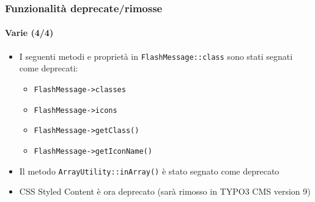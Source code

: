 \begin{frame}[fragile]
	\frametitle{Funzionalità deprecate/rimosse}
	\framesubtitle{Varie (4/4)}

	\begin{itemize}

		\item I seguenti metodi e proprietà in \texttt{FlashMessage::class}
			sono stati segnati come deprecati:

			\begin{itemize}
				\item \texttt{FlashMessage->classes}
				\item \texttt{FlashMessage->icons}
				\item \texttt{FlashMessage->getClass()}
				\item \texttt{FlashMessage->getIconName()}
			\end{itemize}

		\item Il metodo \texttt{ArrayUtility::inArray()} è stato segnato come deprecato

		\item CSS Styled Content è ora deprecato\newline
			\small(sarà rimosso in TYPO3 CMS version 9)\normalsize

	\end{itemize}

\end{frame}


